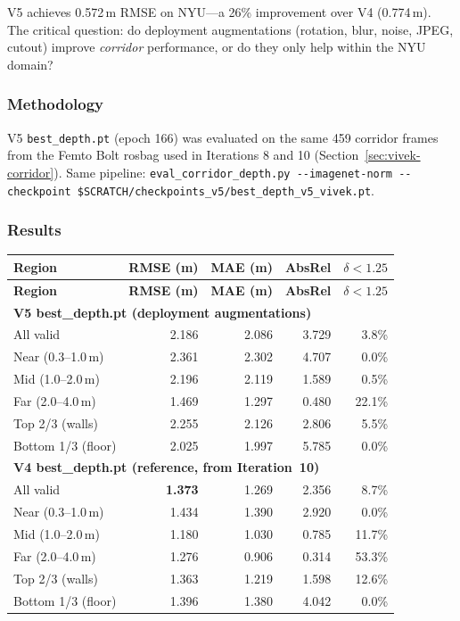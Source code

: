 \documentclass[11pt,a4paper]{article}
\begin{document}
V5 achieves 0.572\,m RMSE on NYU---a 26\% improvement over V4 (0.774\,m).
The critical question: do deployment augmentations (rotation, blur, noise,
JPEG, cutout) improve \emph{corridor} performance, or do they only help
within the NYU domain?

\subsubsection{Methodology}

V5 \texttt{best\_depth.pt} (epoch 166) was evaluated on the same 459 corridor
frames from the Femto Bolt rosbag used in Iterations 8 and 10
(Section~\ref{sec:vivek-corridor}). Same pipeline:
\texttt{eval\_corridor\_depth.py -{}-imagenet-norm -{}-checkpoint
\$SCRATCH/checkpoints\_v5/best\_depth\_v5\_vivek.pt}.

\subsubsection{Results}

\begin{longtable}{lrrrr}
\toprule
\textbf{Region} & \textbf{RMSE (m)} & \textbf{MAE (m)} & \textbf{AbsRel} & \textbf{$\delta < 1.25$} \\
\midrule
\endfirsthead
\toprule
\textbf{Region} & \textbf{RMSE (m)} & \textbf{MAE (m)} & \textbf{AbsRel} & \textbf{$\delta < 1.25$} \\
\midrule
\endhead
\multicolumn{5}{l}{\textbf{V5 best\_depth.pt (deployment augmentations)}} \\
\midrule
All valid          & \textcolor{regression}{2.186} & 2.086 & 3.729 &  3.8\% \\
Near (0.3--1.0\,m) & 2.361 & 2.302 & 4.707 &  0.0\% \\
Mid (1.0--2.0\,m)  & 2.196 & 2.119 & 1.589 &  0.5\% \\
Far (2.0--4.0\,m)  & 1.469 & 1.297 & 0.480 & 22.1\% \\
Top 2/3 (walls)    & 2.255 & 2.126 & 2.806 &  5.5\% \\
Bottom 1/3 (floor) & 2.025 & 1.997 & 5.785 &  0.0\% \\
\midrule
\multicolumn{5}{l}{\textbf{V4 best\_depth.pt (reference, from Iteration~10)}} \\
\midrule
All valid          & \textcolor{improved}{\textbf{1.373}} & 1.269 & 2.356 &  8.7\% \\
Near (0.3--1.0\,m) & 1.434 & 1.390 & 2.920 &  0.0\% \\
Mid (1.0--2.0\,m)  & 1.180 & 1.030 & 0.785 & 11.7\% \\
Far (2.0--4.0\,m)  & 1.276 & 0.906 & 0.314 & 53.3\% \\
Top 2/3 (walls)    & 1.363 & 1.219 & 1.598 & 12.6\% \\
Bottom 1/3 (floor) & 1.396 & 1.380 & 4.042 &  0.0\% \\
\bottomrule
\end{longtable}
\end{document}
